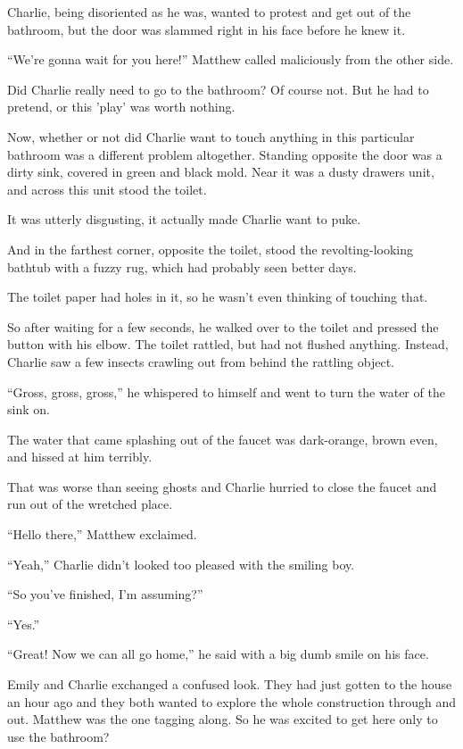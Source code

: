 Charlie, being disoriented as he was, wanted to protest and get out of the bathroom, but the door was slammed right in his face before he knew it.

“We're gonna wait for you here!” Matthew called maliciously from the other side.

Did Charlie really need to go to the bathroom? Of course not. But he had to pretend, or this 'play' was worth nothing.

Now, whether or not did Charlie want to touch anything in this particular bathroom was a different problem altogether. Standing opposite the door was a dirty sink, covered in green and black mold. Near it was a dusty drawers unit, and across this unit stood the toilet.

It was utterly disgusting, it actually made Charlie want to puke.

And in the farthest corner, opposite the toilet, stood the revolting-looking bathtub with a fuzzy rug, which had probably seen better days.

The toilet paper had holes in it, so he wasn't even thinking of touching that.

So after waiting for a few seconds, he walked over to the toilet and pressed the button with his elbow. The toilet rattled, but had not flushed anything. Instead, Charlie saw a few insects crawling out from behind the rattling object.

“Gross, gross, gross,” he whispered to himself and went to turn the water of the sink on.

The water that came splashing out of the faucet was dark-orange, brown even, and hissed at him terribly.

That was worse than seeing ghosts and Charlie hurried to close the faucet and run out of the wretched place.

“Hello there,” Matthew exclaimed.

“Yeah,” Charlie didn't looked too pleased with the smiling boy.

“So you've finished, I'm assuming?”

“Yes.”

“Great! Now we can all go home,” he said with a big dumb smile on his face.

Emily and Charlie exchanged a confused look. They had just gotten to the house an hour ago and they both wanted to explore the whole construction through and out. Matthew was the one tagging along. So he was excited to get here only to use the bathroom?


